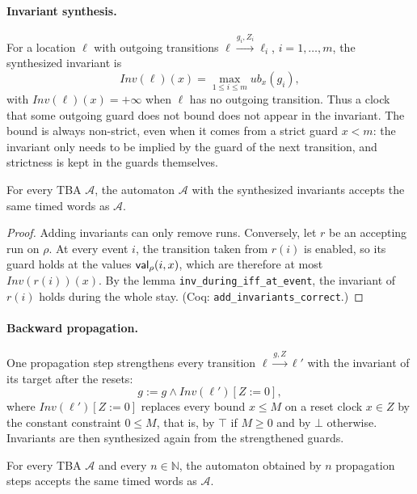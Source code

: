 \paragraph{Invariant synthesis.}
For a location $\ell$ with outgoing transitions
$\ell\xrightarrow{g_i,Z_i}\ell_i$, $i=1,\dots,m$, the synthesized invariant is
\[
  \mathit{Inv}(\ell)(x)=\max_{1\le i\le m}\mathit{ub}_x(g_i),
\]
with $\mathit{Inv}(\ell)(x)=+\infty$ when $\ell$ has no outgoing transition.
Thus a clock that some outgoing guard does not bound does not appear in the
invariant.  The bound is always non-strict, even when it comes from a strict
guard $x<m$: the invariant only needs to be implied by the guard of the next
transition, and strictness is kept in the guards themselves.

\begin{theorem}
\label{thm:inv-synthesis}
For every TBA $\mathcal A$, the automaton $\mathcal A$ with the synthesized
invariants accepts the same timed words as $\mathcal A$.
\end{theorem}

\begin{proof}
Adding invariants can only remove runs.  Conversely, let $r$ be an accepting
run on $\rho$.  At every event $i$, the transition taken from $r(i)$ is enabled,
so its guard holds at the values $\mathsf{val}_\rho(i,x)$, which are therefore at most
$\mathit{Inv}(r(i))(x)$.  By the lemma \texttt{inv\_\allowbreak{}during\_\allowbreak{}iff\_\allowbreak{}at\_\allowbreak{}event}, the invariant of $r(i)$ holds during
the whole stay.  (Coq: \texttt{add\_\allowbreak{}invariants\_\allowbreak{}correct}.)
\end{proof}

\paragraph{Backward propagation.}
One propagation step strengthens every transition
$\ell\xrightarrow{g,Z}\ell'$ with the invariant of its target after the
resets:
\[
  g := g\wedge\mathit{Inv}(\ell')[Z:=0],
\]
where $\mathit{Inv}(\ell')[Z:=0]$ replaces every bound $x\le M$ on a reset clock
$x\in Z$ by the constant constraint $0\le M$, that is, by $\top$ if $M\ge0$ and
by $\bot$ otherwise.  Invariants are then synthesized again from the
strengthened guards.

\begin{theorem}
\label{thm:propagation}
For every TBA $\mathcal A$ and every $n\in\mathbb N$, the automaton obtained by
$n$ propagation steps accepts the same timed words as $\mathcal A$.
\end{theorem}

